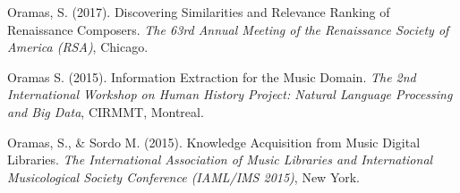 \vspace{0.2cm}

Oramas, S. (2017). Discovering Similarities and Relevance Ranking of Renaissance Composers. \emph{The 63rd Annual Meeting of the Renaissance Society of America (RSA)}, Chicago.

\vspace{0.2cm}

Oramas S. (2015). Information Extraction for the Music Domain. \emph{The 2nd International Workshop on Human History Project: Natural Language Processing and Big Data}, CIRMMT, Montreal.

\vspace{0.2cm}

Oramas, S., \& Sordo M. (2015). Knowledge Acquisition from Music Digital Libraries. \emph{The International Association of Music Libraries and International Musicological Society Conference (IAML/IMS 2015)}, New York.

